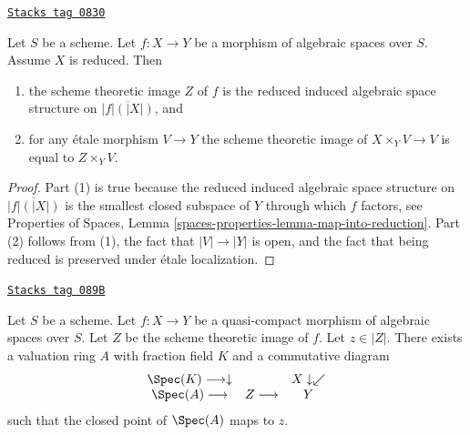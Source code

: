 \begin{lemma}
\label{spaces-morphisms-lemma-scheme-theoretic-image-reduced}
\href{https://stacks.math.columbia.edu/tag/0830}{\texttt{Stacks tag 0830}}

Let $S$ be a scheme. Let $f : X \to Y$ be a morphism of algebraic spaces
over $S$. Assume $X$ is reduced. Then
\begin{enumerate}
\item the scheme theoretic image $Z$ of $f$ is the reduced induced algebraic
space structure on $\overline{|f|(|X|)}$, and
\item for any \'etale morphism $V \to Y$ the scheme theoretic image of
$X \times_Y V \to V$ is equal to $Z \times_Y V$.
\end{enumerate}
\end{lemma}

\begin{proof}
Part (1) is true because the reduced induced algebraic space structure on
$\overline{|f|(|X|)}$ is the smallest closed subspace
of $Y$ through which $f$ factors, see
Properties of Spaces, Lemma \ref{spaces-properties-lemma-map-into-reduction}.
Part (2) follows from (1), the fact that $|V| \to |Y|$ is open, and the
fact that being reduced is preserved under \'etale localization.
\end{proof}

\begin{lemma}
\label{spaces-morphisms-lemma-reach-points-scheme-theoretic-image}
\href{https://stacks.math.columbia.edu/tag/089B}{\texttt{Stacks tag 089B}}

Let $S$ be a scheme.
Let $f : X \to Y$ be a quasi-compact morphism of algebraic spaces over $S$.
Let $Z$ be the scheme theoretic image of $f$.
Let $z \in |Z|$. There exists a valuation ring $A$ with
fraction field $K$ and a commutative diagram
$$
\begin{array}{ccc}\Spec(K) \longrightarrow\downarrow &  & X \downarrow\swarrow \\ \Spec(A) \longrightarrow & Z \longrightarrow & Y\end{array}
$$
such that the closed point of $\Spec(A)$ maps to $z$.
\end{lemma}

